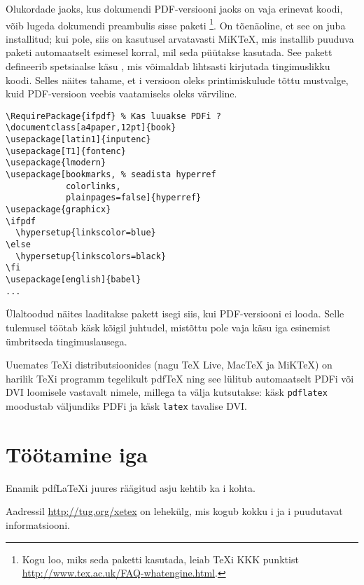 Olukordade jaoks, kus dokumendi PDF-versiooni jaoks on vaja erinevat
koodi, võib lugeda dokumendi preambulis sisse paketi %
\footnote{Kogu loo, miks seda paketti kasutada, leiab \TeX i KKK
punktist \url{http://www.tex.ac.uk/FAQ-whatengine.html}.}.
On tõenäoline, et see on juba installitud; kui pole, siis on kasutusel
arvatavasti MiK\TeX,  mis installib puuduva paketi
automaatselt esimesel korral, mil seda püütakse kasutada. See pakett
defineerib spetsiaalse käsu , mis võimaldab lihtsasti
kirjutada tingimuslikku koodi. Selles näites tahame, et \PSi i versioon
oleks printimiskulude tõttu mustvalge, kuid PDF-versioon veebis
vaatamiseks oleks värviline.
\begin{code}
\begin{verbatim}
\RequirePackage{ifpdf} % Kas luuakse PDFi ?
\documentclass[a4paper,12pt]{book}
\usepackage[latin1]{inputenc}
\usepackage[T1]{fontenc}
\usepackage{lmodern}
\usepackage[bookmarks, % seadista hyperref
            colorlinks,
            plainpages=false]{hyperref}
\usepackage{graphicx}
\ifpdf
  \hypersetup{linkscolor=blue}
\else
  \hypersetup{linkscolors=black}
\fi
\usepackage[english]{babel}
...
\end{verbatim}
\end{code}
Ülaltoodud näites laaditakse pakett  isegi siis, kui
PDF-versiooni ei looda. Selle tulemusel töötab käsk  kõigil
juhtudel, mistõttu pole vaja käsu iga esinemist ümbritseda
tingimuslausega.

Uuemates \TeX i distributsioonides (nagu \TeX{} Live, Mac\TeX{} ja
MiK\TeX{}) on harilik \TeX i programm tegelikult
pdf\TeX{} ning see lülitub automaatselt PDFi või
DVI loomisele vastavalt nimele, millega ta välja kutsutakse: käsk
\verb|pdflatex| moodustab väljundiks PDFi ja käsk
\verb|latex| tavalise DVI.

\section{Töötamine iga}
\label{sec:xetex}

%
Enamik pdf\LaTeX i juures räägitud asju kehtib ka i
kohta.

Aadressil \url{http://tug.org/xetex} on lehekülg, mis kogub kokku
i ja i puudutavat informatsiooni.

